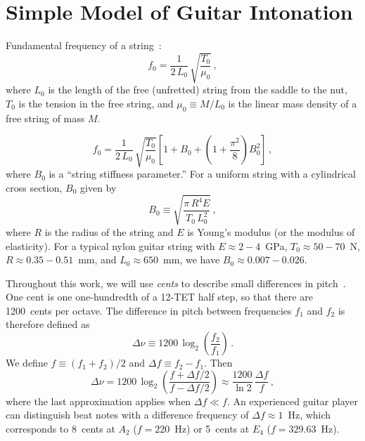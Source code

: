 %
%
%

 \section{Simple Model of Guitar Intonation\label{sct:model}}

Fundamental frequency of a string~\cite{ref:morse1981vas,ref:morse1981vsa}:
 \begin{equation} \label{eqn:f_0_def}
f_0 = \frac{1}{2\, L_0}\, \sqrt{\frac{T_0}{\mu_0}}\, ,
 \end{equation}
where $L_0$ is the length of the free (unfretted) string from the saddle to the nut, $T_0$ is the tension in the free string, and $\mu_0 \equiv M / L_0$ is the linear mass density of a free string of mass $M$.

 \begin{equation} \label{eqn:f_0_stiff}
f_0 = \frac{1}{2\, L_0}\, \sqrt{\frac{T_0}{\mu_0}} \left[ 1 + B_0 + \left(1 + \frac{\pi^2}{8}\right) B_0^2 \right]\, ,
 \end{equation}
where $B_0$ is a ``string stiffness parameter.'' For a uniform string with a cylindrical cross section, $B_0$ given by~\cite{ref:morse1981vsb}
 \begin{equation} \label{eqn:b_def}
B_0 \equiv \sqrt{\frac{\pi\, R^4 E}{T_0\, L_0^2}}\, ,
 \end{equation}
where $R$ is the radius of the string and $E$ is Young's modulus (or the modulus of elasticity). For a typical nylon guitar string with $E \approx 2 - 4$~GPa, $T_0 \approx 50 - 70$~N, $R \approx 0.35 - 0.51$~mm, and $L_0 \approx 650$~mm, we have $B_0 \approx 0.007 - 0.026$.

Throughout this work, we will use \emph{cents} to describe small differences in pitch~\cite{ref:durfee2015pms}. One cent is one one-hundredth of a 12-TET half step, so that there are 1200~cents per octave. The difference in pitch between frequencies $f_1$ and $f_2$ is therefore defined as
 \begin{equation} \label{eqn:cents_def}
\Delta \nu \equiv 1200\, \log_2\left(\frac{f_2}{f_1}\right)\, .
 \end{equation}
We define $f \equiv (f_1 + f_2) / 2$ and $\Delta f \equiv f_2 - f_1$. Then
 \begin{equation} \label{eqn:cents_approx}
\Delta \nu = 1200\, \log_2\left(\frac{f + \Delta f / 2}{f - \Delta f /2}\right) \approx \frac{1200}{\ln 2}\, \frac{\Delta f}{f}\, ,
 \end{equation}
where the last approximation applies when $\Delta f \ll f$. An experienced guitar player can distinguish beat notes with a difference frequency of $\Delta f \approx 1$~Hz, which corresponds to 8~cents at $A_2$ ($f = 220$~Hz) or 5~cents at $E_4$ ($f = 329.63$~Hz).

